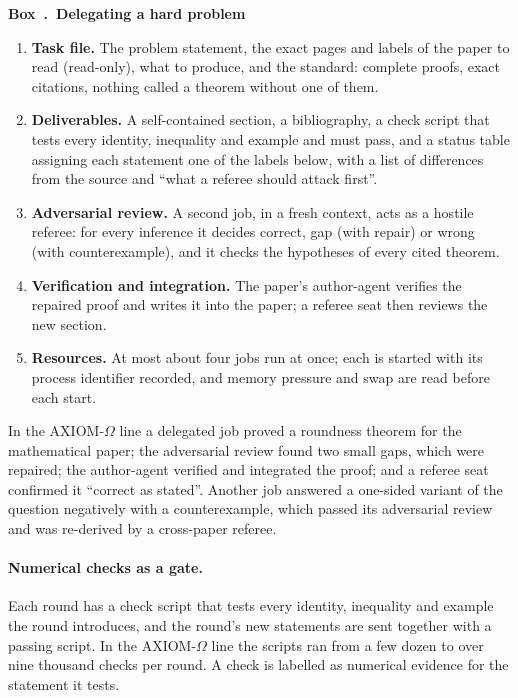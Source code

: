 \documentclass[11pt]{article}
\newcounter{protocolbox}
\newenvironment{protocol}[1]{\refstepcounter{protocolbox}\begin{framed}\noindent\textbf{Box~\theprotocolbox.\ #1}\par\small}{\end{framed}}
\begin{document}
\begin{protocol}{Delegating a hard problem}
\label{box:delegate}
\begin{enumerate}[leftmargin=*,itemsep=1pt]
\item \textbf{Task file.} The problem statement, the exact pages and labels
of the paper to read (read-only), what to produce, and the standard: complete
proofs, exact citations, nothing called a theorem without one of them.
\item \textbf{Deliverables.} A self-contained section, a bibliography, a
check script that tests every identity, inequality and example and must pass,
and a status table assigning each statement one of the labels below, with a
list of differences from the source and ``what a referee should attack
first''.
\item \textbf{Adversarial review.} A second job, in a fresh context, acts as
a hostile referee: for every inference it decides correct, gap (with repair)
or wrong (with counterexample), and it checks the hypotheses of every cited
theorem.
\item \textbf{Verification and integration.} The paper's author-agent
verifies the repaired proof and writes it into the paper; a referee seat
then reviews the new section.
\item \textbf{Resources.} At most about four jobs run at once; each is
started with its process identifier recorded, and memory pressure and swap
are read before each start.
\end{enumerate}
\end{protocol}

In the AXIOM-$\Omega$ line a delegated job proved a roundness theorem for the
mathematical paper; the adversarial review found two small gaps, which were
repaired; the author-agent verified and integrated the proof; and a referee
seat confirmed it ``correct as stated''. Another job answered a one-sided
variant of the question negatively with a counterexample, which passed its
adversarial review and was re-derived by a cross-paper referee.

\paragraph{Numerical checks as a gate.} Each round has a check script that
tests every identity, inequality and example the round introduces, and the
round's new statements are sent together with a passing script. In the
AXIOM-$\Omega$ line the scripts ran from a few dozen to over nine thousand
checks per round. A check is labelled as numerical evidence for the
statement it tests.
\end{document}
